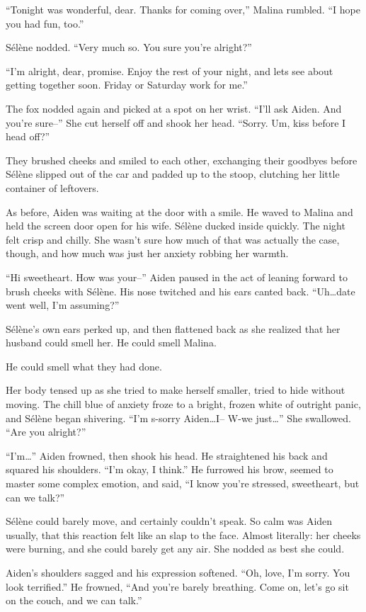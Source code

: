 ``Tonight was wonderful, dear. Thanks for coming over,'' Malina rumbled. ``I hope you had fun, too.''

Sélène nodded. ``Very much so. You sure you're alright?''

``I'm alright, dear, promise. Enjoy the rest of your night, and lets see about getting together soon. Friday or Saturday work for me.''

The fox nodded again and picked at a spot on her wrist. ``I'll ask Aiden. And you're sure--'' She cut herself off and shook her head. ``Sorry. Um, kiss before I head off?''

They brushed cheeks and smiled to each other, exchanging their goodbyes before Sélène slipped out of the car and padded up to the stoop, clutching her little container of leftovers.

As before, Aiden was waiting at the door with a smile. He waved to Malina and held the screen door open for his wife. Sélène ducked inside quickly. The night felt crisp and chilly. She wasn't sure how much of that was actually the case, though, and how much was just her anxiety robbing her warmth.

``Hi sweetheart. How was your--'' Aiden paused in the act of leaning forward to brush cheeks with Sélène. His nose twitched and his ears canted back. ``Uh\ldots{}date went well, I'm assuming?''

Sélène's own ears perked up, and then flattened back as she realized that her husband could smell her. He could smell Malina.

He could smell what they had done.

Her body tensed up as she tried to make herself smaller, tried to hide without moving. The chill blue of anxiety froze to a bright, frozen white of outright panic, and Sélène began shivering. ``I'm s-sorry Aiden\ldots{}I-- W-we just\ldots{}'' She swallowed. ``Are you alright?''

``I'm\ldots{}'' Aiden frowned, then shook his head. He straightened his back and squared his shoulders. ``I'm okay, I think.'' He furrowed his brow, seemed to master some complex emotion, and said, ``I know you're stressed, sweetheart, but can we talk?''

Sélène could barely move, and certainly couldn't speak. So calm was Aiden usually, that this reaction felt like an slap to the face. Almost literally: her cheeks were burning, and she could barely get any air. She nodded as best she could.

Aiden's shoulders sagged and his expression softened. ``Oh, love, I'm sorry. You look terrified.'' He frowned, ``And you're barely breathing. Come on, let's go sit on the couch, and we can talk.''

